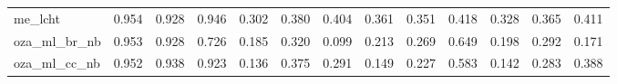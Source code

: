 \begin{tabular}{lrrrrrrrrrrrr}
	me\_lcht        & 0.954                                        & 0.928                                         & 0.946                                      & 0.302                                  & 0.380 & 0.404     & 0.361 & 0.351 & 0.418     & 0.328 & 0.365 & 0.411     \\
	oza\_ml\_br\_nb & 0.953                                        & 0.928                                         & 0.726                                      & 0.185                                  & 0.320 & 0.099     & 0.213 & 0.269 & 0.649     & 0.198 & 0.292 & 0.171     \\
	oza\_ml\_cc\_nb & 0.952                                        & 0.938                                         & 0.923                                      & 0.136                                  & 0.375 & 0.291     & 0.149 & 0.227 & 0.583     & 0.142 & 0.283 & 0.388     \\
	\bottomrule
\end{tabular}
